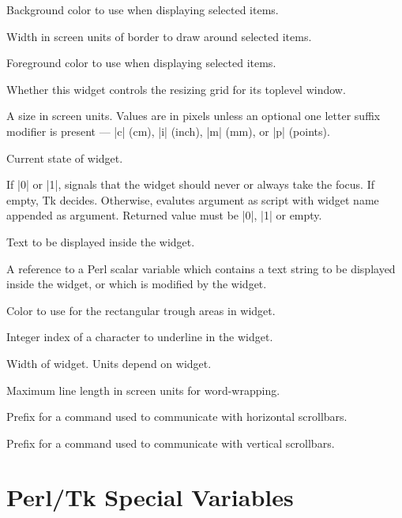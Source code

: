 \begin{enum}{1cm}
Background color to use when displaying selected items.

Width in screen units of border to draw around selected items.

Foreground color to use when displaying selected items.

Whether this widget controls the resizing grid for its 
toplevel  window.

A size in screen units. Values are in pixels unless an optional one letter
suffix modifier is present --- |c| (cm), |i| (inch), |m| (mm), or |p|
(points).

Current state of widget.

If |0| or |1|, signals that the widget should never or always take the focus.
If empty, Tk decides. Otherwise, evalutes argument as script with widget
name appended as argument. Returned value must be |0|, |1| or empty.

Text to be displayed inside the  widget.

A reference to a Perl scalar variable which contains a text string to be displayed inside
the widget, or which is modified by the widget.

Color to use for the rectangular trough areas in widget.

Integer  index  of  a  character to underline in the widget.

Width of widget. Units depend on widget.

Maximum  line  length in screen units for word-wrapping.

Prefix for a command used to communicate with horizontal scrollbars.

Prefix for a command used to communicate with vertical scrollbars.

\end{enum}

\section{Perl/Tk Special Variables}


